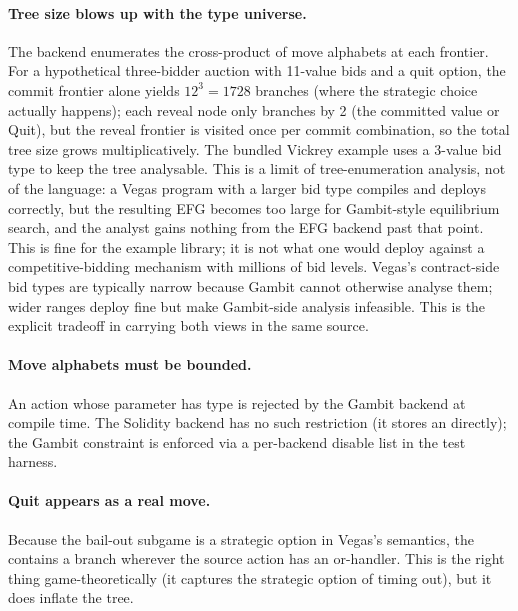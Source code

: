 \paragraph{Tree size blows up with the type universe.}  The
backend enumerates the cross-product of move alphabets at each
frontier.  For a hypothetical three-bidder auction with 11-value
bids and a quit option, the commit frontier alone yields
$12^3 = 1728$ branches (where the strategic choice actually
happens); each reveal node only branches by 2 (the committed
value or Quit), but the reveal frontier is visited once per
commit combination, so the total tree size grows
multiplicatively.  The bundled Vickrey example uses a 3-value
bid type to keep the tree analysable.  This is a limit of
tree-enumeration analysis, not of the language: a Vegas
program with a larger bid type compiles and deploys correctly,
but the resulting EFG becomes too large for Gambit-style
equilibrium search, and the analyst gains nothing from the EFG
backend past that point.  This is fine for the example library;
it is not what one would deploy against a competitive-bidding
mechanism with millions of bid levels.  Vegas's contract-side bid types are typically narrow because
Gambit cannot otherwise analyse them; wider ranges deploy fine
but make Gambit-side analysis infeasible.  This is the explicit
tradeoff in carrying both views in the same source.

\paragraph{Move alphabets must be bounded.}  An action whose
parameter has type  is rejected by the Gambit backend at
compile time.  The Solidity backend has no such restriction (it
stores an  directly); the Gambit constraint is
enforced via a per-backend disable list in the test harness.

\paragraph{Quit appears as a real move.}  Because the bail-out
subgame is a strategic option in Vegas's semantics, the
 contains a  branch wherever the source action
has an or-handler.  This is the right thing
game-theoretically (it captures the strategic option of timing
out), but it does inflate the tree.

